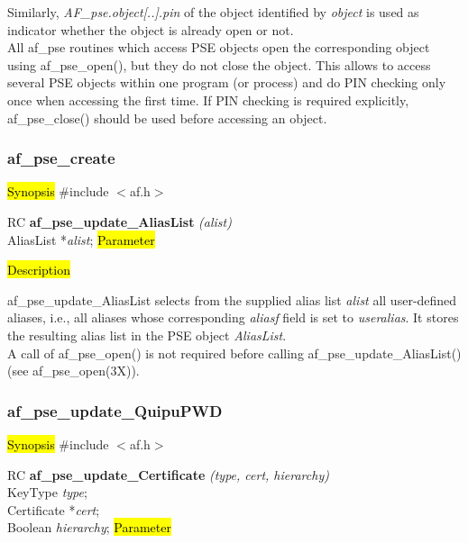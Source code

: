 Similarly, {\em AF\_pse.object[..].pin} of the object identified by {\em object} is used as
indicator whether the object is already open or not.
\\ [1em]
All af\_pse routines which access PSE objects
open the corresponding object using af\_pse\_open(), but they do not
close the object. This allows to access several PSE objects within one program (or process)
and do PIN checking only once when accessing the first time. If PIN checking is required explicitly,
af\_pse\_close() should be used before accessing an object.

\subsubsection{af\_pse\_create}
\label{af_update_AliasList}
\hl{Synopsis}
\#include $<$af.h$>$ 

RC {\bf af\_pse\_update\_AliasList} {\em (alist)} \\
AliasList *{\em alist};
\hl{Parameter}

\hl{Description}

af\_pse\_update\_AliasList selects from the supplied alias list {\em alist} all user-defined aliases, i.e.,
all aliases whose corresponding {\em aliasf} field is set to {\em useralias}. It stores the
resulting alias list in the PSE object {\em AliasList}.
\\ [1em]
A call of af\_pse\_open() is not required before calling af\_pse\_update\_AliasList()
(see af\_pse\_open(3X)).


\subsubsection{af\_pse\_update\_QuipuPWD}
\label{af_update_Certificate}
\hl{Synopsis}
\#include $<$af.h$>$

RC {\bf af\_pse\_update\_Certificate} {\em (type, cert, hierarchy)} \\
KeyType {\em type}; \\
Certificate *{\em cert}; \\
Boolean {\em hierarchy};
\hl{Parameter}

